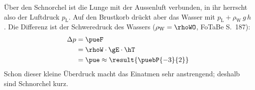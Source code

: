 Über den Schnorchel ist die Lunge mit der Aussenluft verbunden, in ihr herrscht also der Luftdruck $p_\text{L}$. Auf den Brustkorb drückt aber das Wasser mit $p_\text{L} + \rho_\text{W}\,g\,h$. Die Differenz ist der Schweredruck des Wassers ($\rho_\text{W} = \rhoWO$, FoTaBe S.~187):
\begin{align}
 \Delta p &= \pueF \\
   &= \rhoW\cdot\gE\cdot\hT \\
   &= \pue \approx \result{\puebP{-3}{2}}
\end{align}
Schon dieser kleine Überdruck macht das Einatmen sehr anstrengend; deshalb sind Schnorchel kurz.
